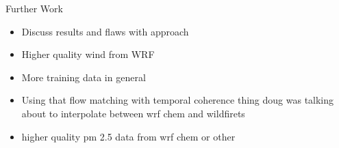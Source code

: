 \documentclass[final]{beamer}
\newlength{\sepwidth}
\newlength{\colwidth}
\newcommand{\separatorcolumn}{\begin{column}{\sepwidth}\end{column}}
\begin{document}
\begin{frame}[t]
\begin{columns}[t]
\begin{column}{\colwidth}
  \begin{block}{Further Work}
     \begin{itemize}
    \item Discuss results and flaws with approach
    \item Higher quality wind from WRF
    \item More training data in general
    \item Using that flow matching with temporal coherence thing doug was talking about to interpolate between wrf chem and wildfirets
    \item higher quality pm 2.5 data from wrf chem or other

\end{itemize}

  \end{block}

  


 

  

  

\end{column}

\separatorcolumn


\end{columns}
\end{frame}
\end{document}
